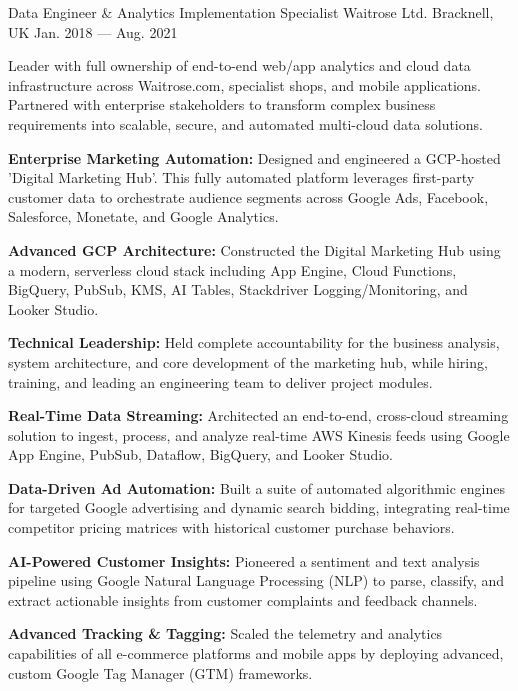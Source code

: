\begin{cventries}
  \cventry
  {Data Engineer \& Analytics Implementation Specialist} %
  {Waitrose Ltd. } %
  {Bracknell, UK} %
  {Jan. 2018 --- Aug. 2021} %
  {
    \begin{cvitems} %
      \item {Leader with full ownership of end-to-end web/app analytics and cloud data infrastructure across Waitrose.com, specialist shops, and mobile applications. Partnered with enterprise stakeholders to transform complex business requirements into scalable, secure, and automated multi-cloud data solutions.}
      \item {\textbf{Enterprise Marketing Automation:} Designed and engineered a GCP-hosted 'Digital Marketing Hub'. This fully automated platform leverages first-party customer data to orchestrate audience segments across Google Ads, Facebook, Salesforce, Monetate, and Google Analytics.}
      \item {\textbf{Advanced GCP Architecture:} Constructed the Digital Marketing Hub using a modern, serverless cloud stack including App Engine, Cloud Functions, BigQuery, PubSub, KMS, AI Tables, Stackdriver Logging/Monitoring, and Looker Studio.}
      \item {\textbf{Technical Leadership:} Held complete accountability for the business analysis, system architecture, and core development of the marketing hub, while hiring, training, and leading an engineering team to deliver project modules.}
      \item {\textbf{Real-Time Data Streaming:} Architected an end-to-end, cross-cloud streaming solution to ingest, process, and analyze real-time AWS Kinesis feeds using Google App Engine, PubSub, Dataflow, BigQuery, and Looker Studio.}
      \item {\textbf{Data-Driven Ad Automation:} Built a suite of automated algorithmic engines for targeted Google advertising and dynamic search bidding, integrating real-time competitor pricing matrices with historical customer purchase behaviors.}
      \item {\textbf{AI-Powered Customer Insights:} Pioneered a sentiment and text analysis pipeline using Google Natural Language Processing (NLP) to parse, classify, and extract actionable insights from customer complaints and feedback channels.}
      \item {\textbf{Advanced Tracking \& Tagging:} Scaled the telemetry and analytics capabilities of all e-commerce platforms and mobile apps by deploying advanced, custom Google Tag Manager (GTM) frameworks.}

\end{cvitems}}
\end{cventries}
